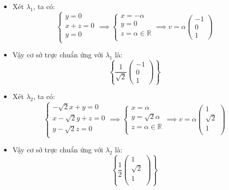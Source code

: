 \documentclass[a4paper, 12pt]{report}
\begin{document}
\begin{itemize}
    \item Xét $\lambda_1$, ta có:
    $$
    \begin{cases}
        y = 0 \\
        x + z = 0 \\
        y = 0 \\
    \end{cases}
    \implies
    \begin{cases}
        x = -\alpha \\
        y = 0 \\
        z = \alpha \in \mathbb{R} \\
    \end{cases}
    \implies
    v = \alpha \begin{pmatrix}
        -1 \\
        0 \\
        1
    \end{pmatrix}
    $$

    \item Vậy cơ sở trực chuẩn ứng với $\lambda_1$ là:
    $$
    \left\{
    \dfrac{1}{\sqrt{2}}
    \begin{pmatrix}
        -1 \\
        0 \\
        1
    \end{pmatrix}
    \right\}
    $$

    \item Xét $\lambda_2$, ta có:
    $$
    \begin{cases}
        -\sqrt{2}x + y = 0 \\
        x - \sqrt{2}y + z = 0 \\
        y - \sqrt{2}z = 0 \\
    \end{cases}
    \implies
    \begin{cases}
        x = \alpha \\
        y = \sqrt{2} \alpha \\
        z = \alpha \in \mathbb{R} \\
    \end{cases}
    \implies
    v = \alpha
    \begin{pmatrix}
        1 \\
        \sqrt{2} \\
        1 \\
    \end{pmatrix}
    $$

    \item Vậy cơ sở trực chuẩn ứng với $\lambda_2$ là:
    $$
    \left\{
    \dfrac{1}{2}
    \begin{pmatrix}
        1 \\
        \sqrt{2} \\
        1 \\
    \end{pmatrix}
    \right\}
    $$


\end{itemize}
\end{document}
